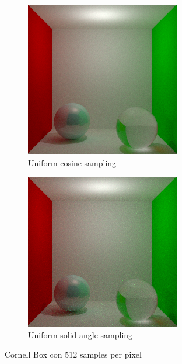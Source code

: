 \documentclass{article}
\begin{document}
\begin{figure}
\begin{subfigure}[h]{0.4\linewidth}
\includegraphics[width=\linewidth]{imgs/cosine_box512.png}
\caption{Uniform cosine sampling}
\end{subfigure}
\hfill
\begin{subfigure}[h]{0.4\linewidth}
\includegraphics[width=\linewidth]{imgs/solid_angle_box512.png}
\caption{Uniform solid angle sampling}
\end{subfigure}%
\caption{Cornell Box con 512 samples per pixel}
\end{figure}
\end{document}
